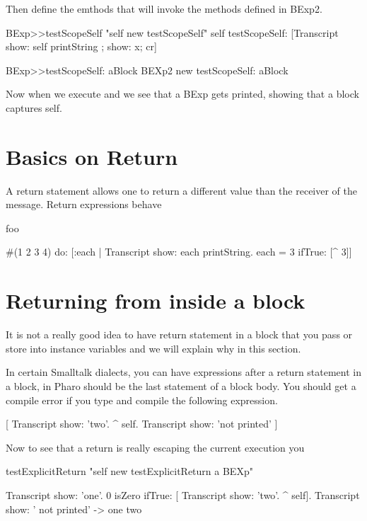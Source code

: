 \documentclass[a4paper,10pt,twoside]{book}
\begin{document}
Then define the emthods that will invoke the methods defined in BExp2.
\begin{code}{}	
BExp>>testScopeSelf
	"self new testScopeSelf"
	self testScopeSelf: [Transcript show: self printString ; show: x; cr]

BExp>>testScopeSelf: aBlock
	BEXp2 new testScopeSelf: aBlock
\end{code}	
	
	

Now when we execute  and we see that a BExp gets printed, showing that a block captures self. 


\section{Basics on Return}

A return statement allows one to return a different value than the receiver of the message.
Return expressions behave 

\begin{code}{}
foo
	
	#(1 2 3 4) do: [:each | Transcript show: each printString. 
						each = 3 
							ifTrue: [^ 3]]
\end{code}



\section{Returning from inside a block}
It is not a really good idea to have return statement in a block that you pass or store into instance variables and we will explain why in this section. 

In certain Smalltalk dialects, you can have expressions after a return statement in a block, in Pharo \ct{^} should be the last statement of a block body. You should get a compile error if you type and compile the following expression. 

\begin{code}{}
[ Transcript show: 'two'.
  ^ self.  
  Transcript show: 'not printed' ]
\end{code}

Now to see that a return is really escaping the current execution you 
\begin{code}{}
testExplicitReturn
	"self new testExplicitReturn a BEXp"
	
	Transcript show: 'one'.
	0 isZero ifTrue: [ Transcript show: 'two'. ^ self].
	Transcript show: ' not printed'
-> one two
\end{code}
\end{document}
